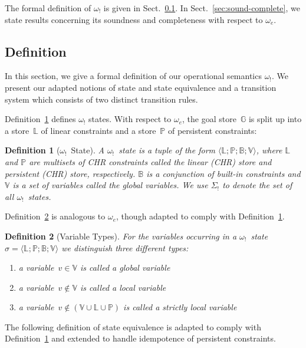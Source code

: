 \documentclass{tlp}
\newtheorem{definition}{Definition}[section]
\newcommand{\B}{\ensuremath{\mathbb{B}}}
\newcommand{\G}{\ensuremath{\mathbb{G}}}
\newcommand{\bL}{\ensuremath{\mathbb{L}}}
\newcommand{\bP}{\ensuremath{\mathbb{P}}}
\newcommand{\V}{\ensuremath{\mathbb{V}}}
\newcommand{\bang}{\ensuremath{!}}
\def\tuple#1{\langle #1 \rangle}
\newcommand{\stbang}[4]{\ensuremath{\tuple{#1; #2; #3; #4}}}
\newcommand{\obang}{\ensuremath{{\omega_\bang}}}
\newcommand{\oesq}{\ensuremath{{\omega_e}}}
\newcommand{\Sbang}{\ensuremath{{\Sigma_{\bang}}}}
\begin{document}
The formal definition of $\obang$ is given in Sect.~\ref{sec:definition}.
In Sect.~\ref{sec:sound-complete}, we state results concerning its soundness
and completeness with respect to $\oesq$.

\subsection{Definition}
\label{sec:definition}

In this section, we give a formal definition of our operational semantics
$\obang$. We present our adapted notions of state and state equivalence and a
transition system which consists of two distinct transition rules.

Definition~\ref{def:b_state} defines $\obang$ states. With respect to $\oesq$,
the goal store~$\G$ is split up into a store~$\bL$ of linear
constraints and a store~$\bP$ of persistent constraints:

\begin{definition}[$\obang$~State]\label{def:b_state} A \emph{$\obang$~state} is
a tuple of the form $\stbang{\bL}{\bP}{\B}{\V}$, where $\bL$ and $\bP$ are
multisets of CHR constraints called the \emph{linear (CHR) store} and
\emph{persistent (CHR) store}, respectively. $\B$ is a conjunction of built-in
constraints and $\V$ is a set of variables called the \emph{global variables}. We
use $\Sbang$ to denote the set of all \obang~states.
\end{definition}

Definition~\ref{def:b-vartypes} is analogous to $\oesq$, though adapted to
comply with Definition~\ref{def:b_state}.

\begin{definition}[Variable Types]\label{def:b-vartypes} For the variables
occurring in a \obang~state~$\sigma = \stbang{\bL}{\bP}{\B}{\V}$ we distinguish three different types:
\begin{enumerate}
  \item a variable~$v \in \V$ is called a {\em global} variable
  \item a variable~$v \not \in \V$ is called a {\em local} variable
  \item a variable~$v \not \in (\V \cup \bL \cup \bP)$ is called a {\em strictly
  local} variable
\end{enumerate}
\end{definition}

The following definition of state equivalence is adapted to comply with
Definition~\ref{def:b_state} and extended to handle idempotence of
persistent constraints.
\end{document}
